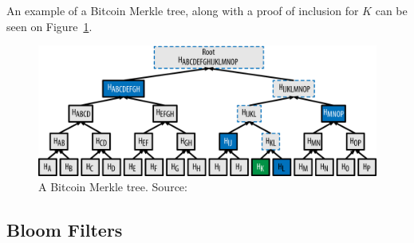An example of a Bitcoin Merkle tree, along with a proof of inclusion for $K$ can be seen on Figure~\ref{fig:merkletree}.

\begin{figure}
  \centering
  \includegraphics[width=0.9\columnwidth,keepaspectratio]{figures/merkle-tree-proof.png}
  \caption{A Bitcoin Merkle tree. Source:~\cite{mastering}}
  \label{fig:merkletree}
\end{figure}

\subsection{Bloom Filters}
